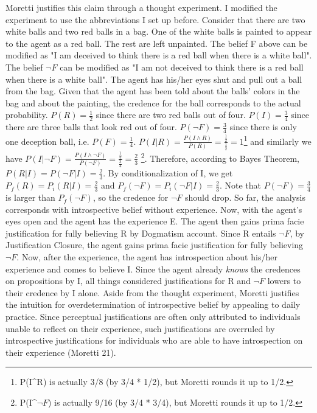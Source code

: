 Moretti justifies this claim through a thought experiment. I modified
the experiment to use the abbreviations I set up before. Consider that
there are two white balls and two red balls in a bag. One of the white
balls is painted to appear to the agent as a red ball. The rest are left
unpainted. The belief F above can be modified as "I am deceived to think
there is a red ball when there is a white ball". The belief
$\neg F$ can be modified as "I am not deceived to think there
is a red ball when there is a white ball". The agent has his/her eyes
shut and pull out a ball from the bag. Given that the agent has been
told about the balls' colors in the bag and about the painting, the
credence for the ball corresponds to the actual probability.
\(P(R) = \frac{1}{2}\) since there are two red balls out of four.
\(P(I) = \frac{3}{4}\) since there are three balls that look red out of
four. \(P(\neg F) = \frac{3}{4}\) since there is only one deception
ball, i.e. \(P(F) = \frac{1}{4}\).
\(P(I|R) = \frac{P(I \land R)}{P(R)} = \frac{\frac{1}{2}}{\frac{1}{2}} = 1\)\footnote{P(I\^{}R)
  is actually 3/8 (by 3/4 * 1/2), but Moretti rounds it up to 1/2.} and
similarly we have
\(P(I|\neg F) = \frac{P(I \land \neg F)}{P(\neg F)} = \frac{\frac{1}{2}}{\frac{3}{4}} = \frac{2}{3}\)
\footnote{P(I\^{}$\neg F$) is actually 9/16 (by 3/4 * 3/4),
  but Moretti rounds it up to 1/2.}. Therefore, according to Bayes
Theorem, \(P(R|I) = P(\neg F|I) = \frac{2}{3}\). By conditionalization
of I, we get \(P_{f}(R) = P_{i}(R|I) = \frac{2}{3}\) and
\(P_{f}(\neg F) = P_{i}(\neg F|I) = \frac{2}{3}\). Note that
\(P(\neg F) = \frac{3}{4}\) is larger than \(P_{f}(\neg F)\), so the
credence for $\neg F$ should drop. So far, the analysis
corresponds with introspective belief without experience. Now, with the
agent's eyes open and the agent has the experience E. The agent then
gains prima facie justification for fully believing R by Dogmatism
account. Since R entails $\neg F$, by Justification Closure,
the agent gains prima facie justification for fully believing
$\neg F$. Now, after the experience, the agent has
introspection about his/her experience and comes to believe I. Since the
agent already \emph{knows} the credences on propositions by I, all
things considered justifications for R and $\neg F$ lowers to
their credence by I alone. Aside from the thought experiment, Moretti
justifies the intuition for overdetermination of introspective belief by
appealing to daily practice. Since perceptual justifications are often
only attributed to individuals unable to reflect on their experience,
such justifications are overruled by introspective justifications for
individuals who are able to have introspection on their experience
(Moretti 21).


